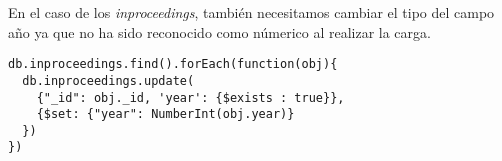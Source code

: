 En el caso de los \textit{inproceedings}, también necesitamos cambiar el tipo del campo año ya que no ha sido reconocido como númerico al realizar la carga.
  
\begin{verbatim}
db.inproceedings.find().forEach(function(obj){
  db.inproceedings.update(
    {"_id": obj._id, 'year': {$exists : true}},
    {$set: {"year": NumberInt(obj.year)}
  })
})
\end{verbatim}

